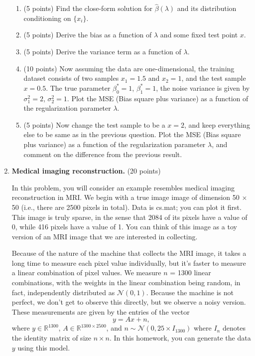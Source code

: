 \documentclass[twoside,10pt]{article}
\begin{document}
\begin{enumerate}
\begin{enumerate}
\item (5 points) Find the close-form solution for $\widehat {\beta}(\lambda)$ and its distribution conditioning on $\{x_i\}$.

\item (5 points) Derive the bias as a function of $\lambda$ and some fixed test point $x$.

\item (5 points) Derive the variance term as a function of $\lambda$.

\item (10 points) Now assuming the data are one-dimensional, the training dataset consists of two samples $x_1 = 1.5$ and $x_2 = 1$,  and the test sample $x = 0.5$. The true parameter $\beta_0^* = 1$, $\beta_1^* = 1$, the noise variance is given by $\sigma_1^2 = 2$, $\sigma_2^2 = 1$. Plot the MSE (Bias square plus variance) as a function of the regularization parameter $\lambda$. 

\item (5 points) Now change the test sample to be a $x=2$, and keep everything else to be same as in the previous question. Plot the MSE (Bias square plus variance) as a function of the regularization parameter $\lambda$, and comment on the difference from the previous result. 

\end{enumerate} 


\clearpage
\item {\bf Medical imaging reconstruction.} (20 points)

In this problem, you will consider an example resembles medical imaging reconstruction in MRI.  We begin with a true image image of dimension 50 $\times$ 50 (i.e., there are 2500 pixels in total). Data is \textsf{cs.mat}; you can plot it first. This image is truly sparse, in the sense that 2084 of its pixels have a value of 0, while 416 pixels have a value of 1. You can think of this image as a toy version of an MRI image that we are interested in collecting.

Because of the nature of the machine that collects the MRI image, it takes a long time to measure each pixel value individually, but it's faster to measure a linear combination of pixel values. We measure $n$ = 1300 linear combinations, with the weights in the linear combination being random, in fact, independently distributed as $\mathcal{N}(0,1)$. Because the machine is not perfect, we don't get to observe this directly, but we observe a noisy version. These measurements are given by the entries of the vector
\[
y = A x + n,
\]
where $y \in \mathbb R^{1300}$, $A \in \mathbb R^{1300\times 2500}$, and $n \sim \mathcal N(0, 25\times I_{1300})$ where $I_n$ denotes the identity matrix of size $n\times n$. In this homework, you can generate the data $y$ using this model. 


\end{enumerate}
\end{document}
